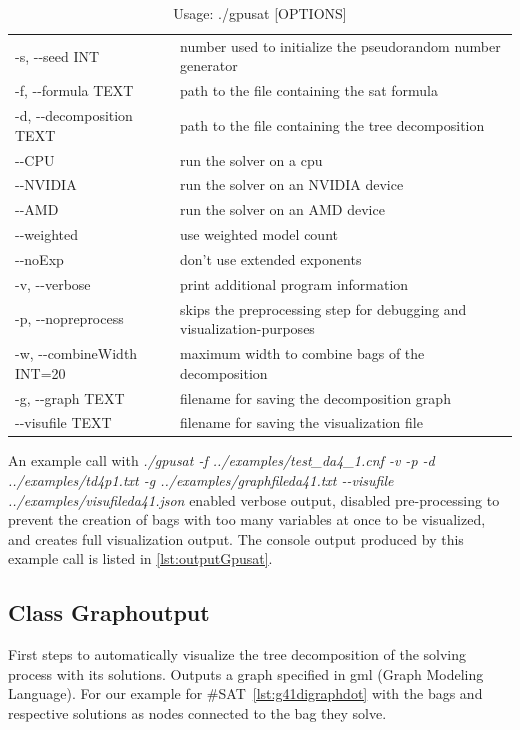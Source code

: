 \documentclass[a4paper, 12pt, bibliography=totoc]{scrartcl}
\begin{document}
\begin{longtable}{ll}
	\caption{Usage: ./gpusat [OPTIONS]
		\label{tab:optionsgpusat}}\\
	\hline
	\vspace{0.5ex}
	\endfirsthead
-s, -{}-seed INT&  number used to initialize the pseudorandom number generator\\
	-f, -{}-formula TEXT &  path to the file containing the sat formula\\
	-d, -{}-decomposition TEXT  &   path to the file containing the tree decomposition\\
	-{}-CPU                   &    run the solver on a cpu\\
	-{}-NVIDIA                &    run the solver on an NVIDIA device\\
	-{}-AMD                   &    run the solver on an AMD device\\
	-{}-weighted              &   use weighted model count\\
	-{}-noExp                 &    don't use extended exponents\\
	-v, -{}-verbose            &    print additional program information\\
	-p, -{}-nopreprocess       &    skips the preprocessing step for debugging and visualization-purposes\\
	-w, -{}-combineWidth INT=20&    maximum width to combine bags of the decomposition\\
	-g, -{}-graph TEXT         &    filename for saving the decomposition graph\\
	-{}-visufile TEXT         &    filename for saving the visualization file\\

\end{longtable}      
        
An example call with \textit{./gpusat -f ../examples/test\_da4\_1.cnf -v -p -d ../examples/td4p1.txt  -g ../examples/graphfileda41.txt -{}-visufile ../examples/visufileda41.json} enabled verbose output, disabled pre-processing to prevent the creation of bags with too many variables at once to be visualized, and creates full visualization output. 
The console output produced by this example call is listed in \ref{lst:outputGpusat}.

\subsection{Class Graphoutput}\label{chagraphoutput}
First steps to automatically visualize the tree decomposition of the solving process with its solutions.
Outputs a graph specified in gml\cite{Himsolt2010GMLAP} (Graph Modeling Language).
For our example for \#SAT~\ref{lst:g41digraphdot} with the bags and respective solutions as nodes connected to the bag they solve.
\end{document}
